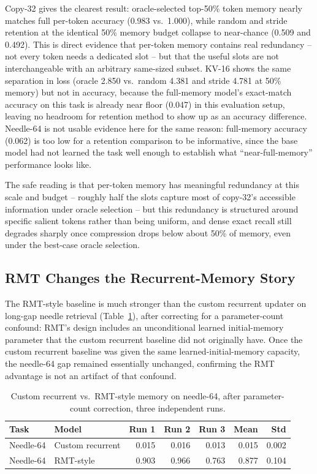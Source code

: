 \documentclass[10pt]{article} %
\begin{document}
Copy-32 gives the clearest result: oracle-selected top-50\% token memory
nearly matches full per-token accuracy (0.983 vs.\ 1.000), while random and
stride retention at the identical 50\% memory budget collapse to
near-chance (0.509 and 0.492). This is direct evidence that per-token
memory contains real redundancy -- not every token needs a dedicated slot
-- but that the useful slots are not interchangeable with an arbitrary
same-sized subset. KV-16 shows the same separation in loss (oracle 2.850
vs.\ random 4.381 and stride 4.781 at 50\% memory) but not in accuracy,
because the full-memory model's exact-match accuracy on this task is
already near floor (0.047) in this evaluation setup, leaving no headroom
for retention method to show up as an accuracy difference. Needle-64 is
not usable evidence here for the same reason: full-memory accuracy (0.062)
is too low for a retention comparison to be informative, since the base
model had not learned the task well enough to establish what
``near-full-memory'' performance looks like.

The safe reading is that per-token memory has meaningful redundancy at
this scale and budget -- roughly half the slots capture most of copy-32's
accessible information under oracle selection -- but this redundancy is
structured around specific salient tokens rather than being uniform, and
dense exact recall still degrades sharply once compression drops below
about 50\% of memory, even under the best-case oracle selection.

\subsection{RMT Changes the Recurrent-Memory Story}
\label{sec:rmt-recurrent-story}

The RMT-style baseline is much stronger than the custom recurrent updater
on long-gap needle retrieval (Table~\ref{tab:rmt_vs_recurrent}), after
correcting for a parameter-count confound: RMT's design includes an
unconditional learned initial-memory parameter that the custom recurrent
baseline did not originally have. Once the custom recurrent baseline was
given the same learned-initial-memory capacity, the needle-64 gap remained
essentially unchanged, confirming the RMT advantage is not an artifact of
that confound.

\begin{table}[h]
\centering
\caption{Custom recurrent vs.\ RMT-style memory on needle-64, after
parameter-count correction, three independent runs.}
\label{tab:rmt_vs_recurrent}
\begin{tabular}{llrrrrr}
\toprule
Task & Model & Run 1 & Run 2 & Run 3 & Mean & Std \\
\midrule
Needle-64 & Custom recurrent & 0.015 & 0.016 & 0.013 & 0.015 & 0.002 \\
Needle-64 & RMT-style        & 0.903 & 0.966 & 0.763 & 0.877 & 0.104 \\
\bottomrule
\end{tabular}
\end{table}
\end{document}
